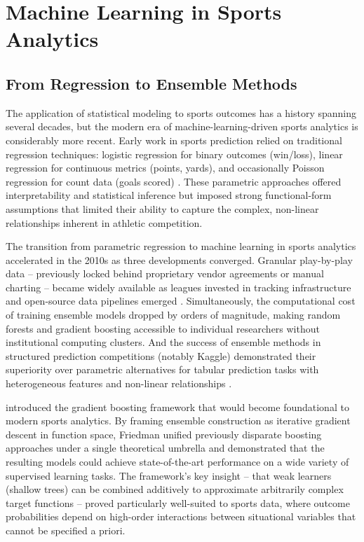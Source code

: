 \section{Machine Learning in Sports Analytics}
\label{sec:ml-sports}

\subsection{From Regression to Ensemble Methods}

The application of statistical modeling to sports outcomes has a history spanning several decades, but the modern era of machine-learning-driven sports analytics is considerably more recent. Early work in sports prediction relied on traditional regression techniques: logistic regression for binary outcomes (win/loss), linear regression for continuous metrics (points, yards), and occasionally Poisson regression for count data (goals scored) \parencite{boulier2003predicting}. These parametric approaches offered interpretability and statistical inference but imposed strong functional-form assumptions that limited their ability to capture the complex, non-linear relationships inherent in athletic competition.

The transition from parametric regression to machine learning in sports analytics accelerated in the 2010s as three developments converged. Granular play-by-play data  -- previously locked behind proprietary vendor agreements or manual charting  -- became widely available as leagues invested in tracking infrastructure and open-source data pipelines emerged \parencite{carl2021nflfastr}. Simultaneously, the computational cost of training ensemble models dropped by orders of magnitude, making random forests and gradient boosting accessible to individual researchers without institutional computing clusters. And the success of ensemble methods in structured prediction competitions (notably Kaggle) demonstrated their superiority over parametric alternatives for tabular prediction tasks with heterogeneous features and non-linear relationships \parencite{chen2016xgboost}.

\textcite{friedman2001gradientboosting} introduced the gradient boosting framework that would become foundational to modern sports analytics. By framing ensemble construction as iterative gradient descent in function space, Friedman unified previously disparate boosting approaches under a single theoretical umbrella and demonstrated that the resulting models could achieve state-of-the-art performance on a wide variety of supervised learning tasks. The framework's key insight  -- that weak learners (shallow trees) can be combined additively to approximate arbitrarily complex target functions  -- proved particularly well-suited to sports data, where outcome probabilities depend on high-order interactions between situational variables that cannot be specified a priori.

